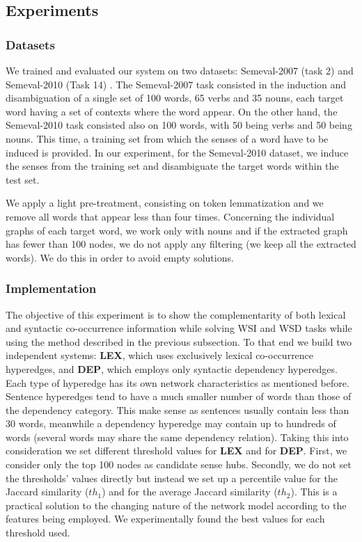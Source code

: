 	
\subsection{Experiments}

\subsubsection{Datasets}
We trained and evaluated our system on two datasets: Semeval-2007 (task 2) \cite{semeval2007task2} and Semeval-2010 (Task 14) \cite{Semeval2010}. The Semeval-2007 task consisted in the induction and disambiguation of a single set of 100 words, 65 verbs and 35 nouns, each target word having a set of contexts where the word appear. On the other hand, the Semeval-2010 task consisted also on 100 words, with 50 being verbs and 50 being nouns. This time, a training set from which the senses of a word have to be induced is provided. In our experiment, for the Semeval-2010 dataset, we induce the senses from the training set and disambiguate the target words within the test set.

We apply a light pre-treatment, consisting on token lemmatization and we remove all words that appear less than four times. Concerning the individual graphs of each target word, we work only with nouns and if the extracted graph has fewer than 100 nodes, we do not apply any filtering (we keep all the extracted words). We do this in order to avoid empty solutions.



\subsubsection{Implementation}
The objective of this experiment is to show the complementarity of both lexical and syntactic co-occurrence information while solving WSI and WSD tasks while using the method described in the previous subsection. To that end we build two independent systems: \textbf{LEX}, which uses exclusively lexical co-occurrence hyperedges, and \textbf{DEP}, which employs only syntactic dependency hyperedges. 
Each type of hyperedge has its own network characteristics as mentioned before. Sentence hyperedges tend to have a much smaller number of words than those of the dependency category. This make sense as sentences usually contain less than 30 words, meanwhile a dependency hyperedge may contain up to hundreds of words (several words may share the same dependency relation). Taking this into consideration we set different threshold values for \textbf{LEX} and for \textbf{DEP}. First, we  consider only the top 100 nodes as candidate sense hubs. Secondly, we do not set the thresholds' values directly but instead we set up a percentile value for the Jaccard similarity ($th_1$) and for the average Jaccard similarity ($th_2$). This is a practical solution to the changing nature of the network model according to the features being employed. We experimentally found the best values for  each threshold used.




